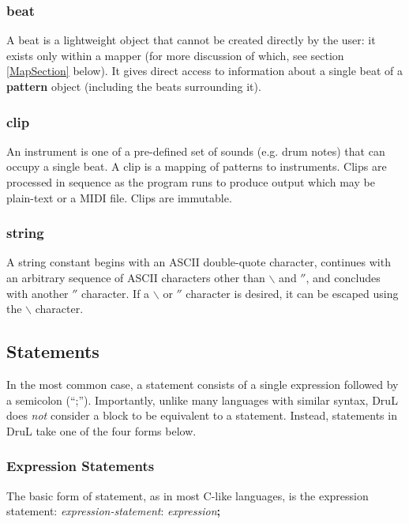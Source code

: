 \subsubsection{beat}

A beat is a lightweight object that cannot be created directly by the user: it exists only within a mapper (for more discussion of which, see section \ref{MapSection} below).  It gives direct access to information about a single beat of a \textbf{pattern} object (including the beats surrounding it).

\subsubsection{clip}

An instrument is one of a pre-defined set of sounds (e.g. drum notes) that can occupy a single beat.
A clip is a mapping of patterns to instruments. Clips are processed in sequence as the program runs to produce output which may be plain-text or a MIDI file.  Clips are immutable.

\subsubsection{string}

A string constant begins with an ASCII double-quote character, continues 
with an arbitrary sequence of ASCII characters other than $\backslash$ and $''$, 
and concludes with another $''$ character.  If a $\backslash$ or $''$ character is 
desired, it can be escaped using the $\backslash$ character.





\subsection{Statements}

In the most common case, a statement consists of a single expression followed by a semicolon (``;'').  Importantly, unlike many languages with similar syntax, DruL does \emph{not} consider a block to be equivalent to a statement.  Instead, statements in DruL take one of the four forms below.

\subsubsection{Expression Statements}

The basic form of statement, as in most C-like languages, is the expression statement: \emph{expression-statement}: \emph{expression}\textbf{;}

